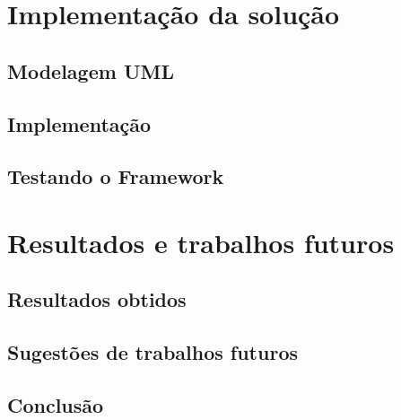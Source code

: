 \documentclass[
    12pt,       %
    openright,      %
    twoside,      %
    a4paper,      %
    english,      %
    french,       %
    spanish,      %
    brazil,       %
    ]{abntex2}
\begin{document}
  \part{Implementação da solução}

  \chapter{Modelagem UML}

  \chapter{Implementação}

  \chapter{Testando o Framework}

  \part{Resultados e trabalhos futuros}

  \chapter{Resultados obtidos}

  \chapter{Sugestões de trabalhos futuros}

  \chapter{Conclusão}





  \lipsum[31-33]

  \postextual


  
\end{document}
